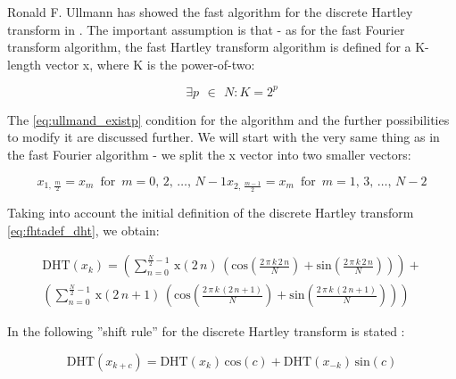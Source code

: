 \documentclass[12pt,twoside,a4paper]{article}
\numberwithin{equation}{subsection}
\numberwithin{figure}{subsection}
\begin{document}
Ronald F. Ullmann has showed the fast algorithm for the discrete Hartley transform in \cite{ullmann_algorithm}. The important
assumption is that - as for the fast Fourier transform algorithm, the fast Hartley transform algorithm is defined for a K-length
vector x, where K is the power-of-two:

\begin{equation} \label{eq:ullmand_existp}
  \exists p\,\ \in\ \,N : K=2^{p}
\end{equation}


The \ref{eq:ullmand_existp} condition for the algorithm and the further possibilities to modify it are discussed further. We will
start with the very same thing as in the fast Fourier algorithm - we split the x vector into two smaller vectors:

\begin{subequations} \label{eq:hartley_smallervectors}
  \begin{equation}   \label{eq:hsvs_even}
    {x_{1, \,\frac {m}{2}}}={x_{m}}\, \mbox{ for }\, m=0, \,2,\,\ldots,\,N - 1
  \end{equation}
  \begin{equation}   \label{eq:hsvs_odd}
    {x_{2, \,\frac {m - 1}{2}}}={x_{m}}\, \mbox{ for }\, m=1, \,3,\,\ldots,\,N - 2
  \end{equation}
\end{subequations}

Taking into account the initial definition of the discrete Hartley transform \ref{eq:fhtadef_dht}, we obtain:

\begin{multline}  \label{eq:hartley_longdht}
 \mathrm{DHT}({x_{k}})= \left(  \! \sum_{n=0}^{\frac {N}{2} - 1}\,\mathrm{x}(2\,n)\,(\mathrm{cos}(\frac {2\,\pi \,k\,2\,n}{N}) +
 \mathrm{sin}(\frac {2\,\pi \,k\,2\,n}{N})) \! \right)  + \\
 \left(  \! \sum_{n=0}^{\frac {N}{2} - 1}\,\mathrm{x}(2\,n +
 1)\,(\mathrm{cos}(\frac {2\,\pi \,k\,(2\,n + 1)}{N}) + \mathrm{sin}(\frac {2\,\pi \,k\,(2\,n + 1)}{N})) \! \right)
\end{multline}

In \cite{ullmann_algorithm} the following ''shift rule'' for the discrete Hartley transform is stated :

\begin{equation} \label{eq:hartley_shiftrule}
  \mathrm{DHT}({x_{k + c}})=\mathrm{DHT}({x_{k}})\,\mathrm{cos}(c)
 + \mathrm{DHT}({x_{ - k}})\,\mathrm{sin}(c)
\end{equation}
\end{document}

